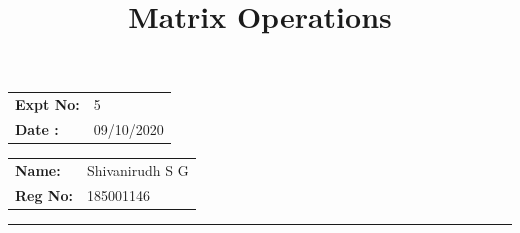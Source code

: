 \documentclass[10pt,a4paper]{article}
\title{\bf Matrix Operations}
\author{\vspace{-10ex}}
\date{\vspace{-10ex}}
\begin{document}
\maketitle

\begin{minipage}{0.45\textwidth}
        \begin{tabular}{l l}
            \textbf{Expt No:}&5\\
            \textbf{Date :}&09/10/2020
        \end{tabular}
\end{minipage}%
\begin{minipage}{0.45\textwidth}
        \begin{tabular}{l l}
             \textbf{Name:}& Shivanirudh S G  \\
             \textbf{Reg No:} & 185001146 
        \end{tabular}
\end{minipage}
\vspace{1cm}
\hrule
\end{document}
